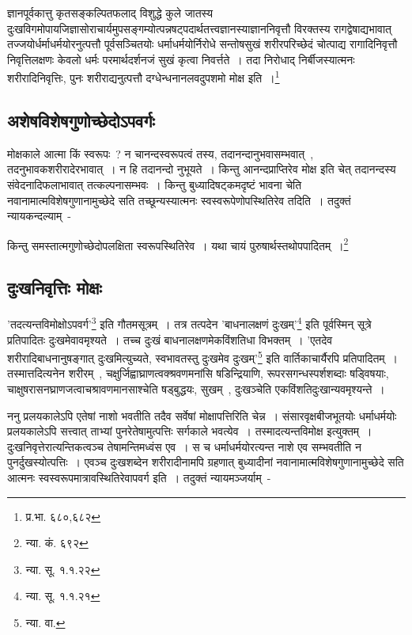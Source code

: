 		{\fontsize{11.7}{0}\selectfont\s ज्ञानपूर्वकात्तु कृतसङ्कल्पितफलाद् विशुद्धे कुले जातस्य दुःखविगमोपायजिज्ञासोराचार्यमुपसङ्गम्योत्पन्नषट्पदार्थतत्त्वज्ञानस्याज्ञाननिवृत्तौ विरक्तस्य रागद्वेषाद्यभावात् तज्जयोर्धर्माधर्मयोरनुत्पत्तौ पूर्वसञ्चितयोः धर्माधर्मयोर्निरोधे सन्तोषसुखं शरीरपरिच्छेदं चोत्पाद्य रागादिनिवृत्तौ निवृत्तिलक्षणः केवलो धर्मः परमार्थदर्शनजं सुखं कृत्वा निवर्त्तते~। तदा निरोधाद् निर्बीजस्यात्मनः शरीरादिनिवृत्तिः, पुनः शरीराद्यनुत्पत्तौ दग्धेन्धनानलवदुपशमो मोक्ष इति~।\footnote{प्र.भा. ६८०,६८२}}

		\subsection{अशेषविशेषगुणोच्छेदोऽपवर्गः}

		मोक्षकाले आत्मा किं स्वरूपः~? न चानन्दस्वरूपत्वं तस्य, तदानन्दानुभवासम्भवात्~, तदनुभावकशरीरादेरभावात्~। न हि तदानन्दो नुभूयते~। किन्तु आनन्दप्राप्तिरेव मोक्ष इति चेत् तदानन्दस्य संवेदनादिफलाभावात् तत्कल्पनासम्भवः~। किन्तु बुध्यादिषट्कमदृष्टं भावना चेति नवानामात्मविशेषगुणानामुच्छेदे सति तच्छून्यस्यात्मनः स्वस्वरूपेणोपस्थितिरेव तदिति~। तदुक्तं न्यायकन्दल्याम्~- 

		{\fontsize{11.7}{0}\selectfont\s किन्तु समस्तात्मगुणोच्छेदोपलक्षिता स्वरूपस्थितिरेव~। यथा चायं पुरुषार्थस्तथोपपादितम्~।\footnote{न्या. कं. ६९२}}

		\subsection{दुःखनिवृत्तिः मोक्षः} 

		'तदत्यन्तविमोक्षोऽपवर्ग'\footnote{न्या. सू. १.१.२२} इति गौतमसूत्रम्~। तत्र तत्पदेन 'बाधनालक्षणं दुःखम्'\footnote{न्या. सू. १.१.२१} इति पूर्वस्मिन् सूत्रे प्रतिपादितः दुःखमेवावमृश्यते~। तच्च दुःखं बाधनालक्षणमेकविंशतिधा विभक्तम्~। 'एतदेव शरीरादिबाधनानुषङ्गात् दुःखमित्युच्यते, स्वभावतस्तु दुःखमेव दुःखम्'\footnote{न्या. वा. } इति वार्तिकाचार्यैरपि प्रतिपादितम्~। तस्मात्तदित्यनेन शरीरम्~, चक्षुर्जिह्वाघ्राणत्वक्श्रवणमनांसि षडिन्द्रियाणि, रूपरसगन्धस्पर्शशब्दाः षड्विषयाः, चाक्षुषरासनघ्राणजत्वाचश्रावणमानसाश्चेति षड्बुद्धयः, सुखम्~, दुःखञ्चेति एकविंशतिदुःखान्यवमृश्यन्ते~।

		ननु प्रलयकालेऽपि एतेषां नाशो भवतीति तदैव सर्वेषां मोक्षापत्तिरिति चेन्न~। संसारवृक्षबीजभूतयोः धर्माधर्मयोः प्रलयकालेऽपि सत्त्वात् ताभ्यां पुनरेतेषामुत्पत्तिः सर्गकाले भवत्येव~। तस्मादत्यन्तविमोक्ष इत्युक्तम्~। दुःखनिवृत्तेरात्यन्तिकत्वञ्च तेषामन्तिमध्वंस एव~। स च धर्माधर्मयोरत्यन्त नाशे एव सम्भवतीति न पुनर्दुखस्योत्पत्तिः~। एवञ्च दुःखशब्देन शरीरादीनामपि ग्रहणात् बुध्यादीनां नवानामात्मविशेषगुणानामुच्छेदे सति आत्मनः स्वस्वरूपमात्रावस्थितिरेवापवर्ग इति~। तदुक्तं न्यायमञ्जर्याम्~-

